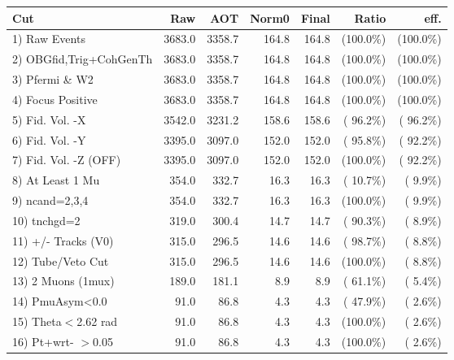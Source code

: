  \begin{table}[h!]\centering
 \begin{tabular}{||l||r|r|r|r|r|r||}
 \hline
 \hline
 Cut & Raw & AOT & Norm0 & Final & Ratio & eff.       \\
 \hline
  1) Raw Events           &       3683.0 &       3358.7 &        164.8 &        164.8 & (100.0\%) & (100.0\%) \\
  2) OBGfid,Trig+CohGenTh &       3683.0 &       3358.7 &        164.8 &        164.8 & (100.0\%) & (100.0\%) \\
  3) Pfermi \& W2         &       3683.0 &       3358.7 &        164.8 &        164.8 & (100.0\%) & (100.0\%) \\
  4) Focus Positive       &       3683.0 &       3358.7 &        164.8 &        164.8 & (100.0\%) & (100.0\%) \\
  5) Fid. Vol. -X         &       3542.0 &       3231.2 &        158.6 &        158.6 & ( 96.2\%) & ( 96.2\%) \\
  6) Fid. Vol. -Y         &       3395.0 &       3097.0 &        152.0 &        152.0 & ( 95.8\%) & ( 92.2\%) \\
  7) Fid. Vol. -Z (OFF)   &       3395.0 &       3097.0 &        152.0 &        152.0 & (100.0\%) & ( 92.2\%) \\
  8) At Least 1 Mu        &        354.0 &        332.7 &         16.3 &         16.3 & ( 10.7\%) & (  9.9\%) \\
  9) ncand=2,3,4          &        354.0 &        332.7 &         16.3 &         16.3 & (100.0\%) & (  9.9\%) \\
 10) tnchgd=2             &        319.0 &        300.4 &         14.7 &         14.7 & ( 90.3\%) & (  8.9\%) \\
 11) +/- Tracks (V0)      &        315.0 &        296.5 &         14.6 &         14.6 & ( 98.7\%) & (  8.8\%) \\
 12) Tube/Veto Cut        &        315.0 &        296.5 &         14.6 &         14.6 & (100.0\%) & (  8.8\%) \\
 13) 2 Muons (1mux)       &        189.0 &        181.1 &          8.9 &          8.9 & ( 61.1\%) & (  5.4\%) \\
 14) PmuAsym<0.0          &         91.0 &         86.8 &          4.3 &          4.3 & ( 47.9\%) & (  2.6\%) \\
 15) Theta$<$2.62 rad     &         91.0 &         86.8 &          4.3 &          4.3 & (100.0\%) & (  2.6\%) \\
 16) Pt+wrt- $>$0.05      &         91.0 &         86.8 &          4.3 &          4.3 & (100.0\%) & (  2.6\%) \\

\end{tabular}
\end{table}
